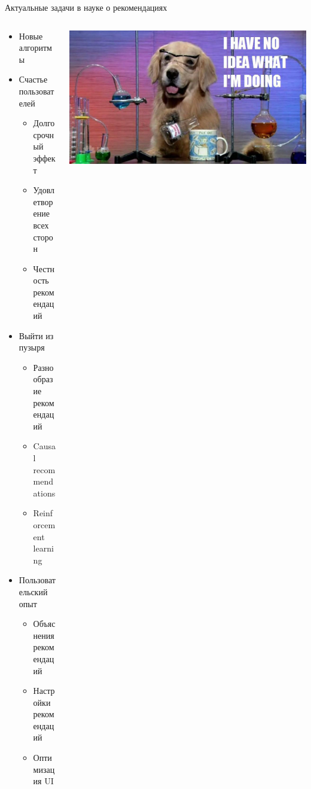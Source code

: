 \documentclass[11pt,aspectratio=169,handout]{beamer}
\begin{document}
\begin{frame}{Актуальные задачи в науке о рекомендациях}

\begin{columns}

\begin{column}{0.5\textwidth}
\begin{itemize}[<+->]
\item Новые алгоритмы
\item Счастье пользователей
	\begin{itemize}
	\item Долгосрочный эффект
	\item Удовлетворение всех сторон
	\item Честность рекомендаций
	\end{itemize}
\item Выйти из пузыря
	\begin{itemize}
	\item Разнообразие рекомендаций
	\item Causal recommendations
	\item Reinforcement learning
	\end{itemize}
\item Пользовательский опыт
	\begin{itemize}
	\item Объяснения рекомендаций
	\item Настройки рекомендаций
	\item Оптимизация UI
	\end{itemize}
\end{itemize}
\end{column}

\begin{column}{0.4\textwidth}
\begin{center}
\includegraphics[scale=0.2]{images/science.jpeg}
\end{center}
\end{column}

\end{columns}

\end{frame}
\end{document}
